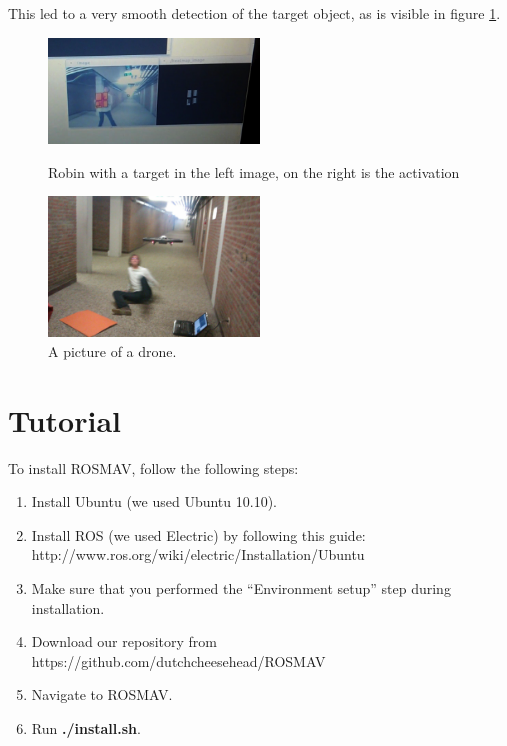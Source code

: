 \documentclass[a4paper,10pt]{article}
\begin{document}
This led to a very smooth detection of the target object, as is visible in figure \ref{fig:robinPresentActivation}. 

\begin{figure}[h!]
	\caption{Robin with a target in the left image, on the right is the activation}
	\centering
	\includegraphics[width=0.5\textwidth]{images/robinPresentActivation}
	\label{fig:robinPresentActivation}
\end{figure}

\begin{figure}[h!]
	\caption{A picture of a drone.}
	\centering
	\includegraphics[width=0.5\textwidth]{images/droneAttack}
\end{figure}

\section{Tutorial}
To install ROSMAV, follow the following steps:
\begin{enumerate}
\item Install Ubuntu (we used Ubuntu 10.10).

\item Install ROS (we used Electric) by following this guide: \\
      http://www.ros.org/wiki/electric/Installation/Ubuntu

\item Make sure that you performed the ``Environment setup'' step during installation.

\item Download our repository from
      https://github.com/dutchcheesehead/ROSMAV

\item Navigate to ROSMAV.

\item Run \textbf{./install.sh}.
\end{enumerate}
\end{document}
